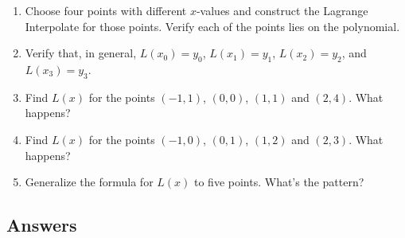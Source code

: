 \begin{enumerate}
\begin{enumerate}
\item Choose four points with different $x$-values and construct the Lagrange Interpolate for those points.  Verify each of the points lies on the polynomial.  

\item  Verify that, in general, $L(x_{0}) = y_{0}$,  $L(x_{1}) = y_{1}$, $L(x_{2}) = y_{2}$, and  $L(x_{3}) = y_{3}$.

\item  Find $L(x)$ for the points $(-1,1)$, $(0,0)$,  $(1,1)$ and $(2,4)$.  What happens?

\item  Find $L(x)$ for the points $(-1,0)$, $(0,1)$,  $(1,2)$ and $(2,3)$.  What happens?

\item  Generalize the formula for $L(x)$ to five points.  What's the pattern?

\end{enumerate}

\setcounter{HW}{\value{enumi}}
\end{enumerate}
\newpage

\subsection{Answers}

